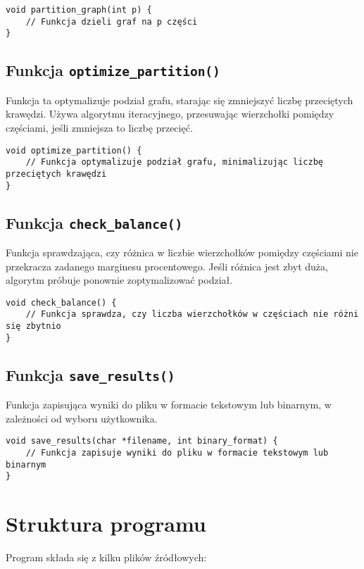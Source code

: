 \documentclass[a4paper,12pt]{article}
\begin{document}
\begin{verbatim}
void partition_graph(int p) {
    // Funkcja dzieli graf na p części
}
\end{verbatim}

\subsection{Funkcja \texttt{optimize\_partition()}}
Funkcja ta optymalizuje podział grafu, starając się zmniejszyć liczbę przeciętych krawędzi. Używa algorytmu iteracyjnego, przesuwając wierzchołki pomiędzy częściami, jeśli zmniejsza to liczbę przecięć.

\begin{verbatim}
void optimize_partition() {
    // Funkcja optymalizuje podział grafu, minimalizując liczbę przeciętych krawędzi
}
\end{verbatim}

\subsection{Funkcja \texttt{check\_balance()}}
Funkcja sprawdzająca, czy różnica w liczbie wierzchołków pomiędzy częściami nie przekracza zadanego marginesu procentowego. Jeśli różnica jest zbyt duża, algorytm próbuje ponownie zoptymalizować podział.

\begin{verbatim}
void check_balance() {
    // Funkcja sprawdza, czy liczba wierzchołków w częściach nie różni się zbytnio
}
\end{verbatim}

\subsection{Funkcja \texttt{save\_results()}}
Funkcja zapisująca wyniki do pliku w formacie tekstowym lub binarnym, w zależności od wyboru użytkownika.

\begin{verbatim}
void save_results(char *filename, int binary_format) {
    // Funkcja zapisuje wyniki do pliku w formacie tekstowym lub binarnym
}
\end{verbatim}

\section{Struktura programu}

Program składa się z kilku plików źródłowych:
\end{document}
